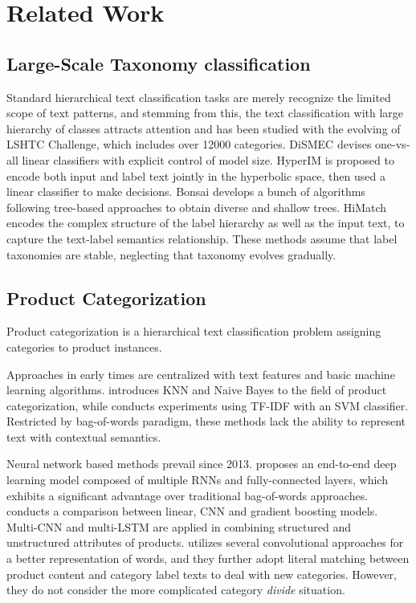 \section{Related Work}
\subsection{Large-Scale Taxonomy classification}
Standard hierarchical text classification tasks \cite{kowsari2017hdltex, sinha-etal-2018-hierarchical} are merely recognize the limited scope of text patterns, and stemming from this, the text classification with large hierarchy of classes attracts attention and has been studied with the evolving of LSHTC \cite{partalas2015lshtc} Challenge, which includes 
over 12000 categories. DiSMEC \cite{babbar2017dismec} devises one-vs-all linear classifiers 
with explicit control of model size. HyperIM \cite{chen2020hyperbolic} is proposed to encode both input and label text jointly in the hyperbolic space, then used a linear classifier to make decisions. Bonsai \cite{khandagale2020bonsai} develops a bunch of algorithms following tree-based approaches to obtain diverse and shallow trees. HiMatch~\cite{chen2021hierarchy} encodes the complex structure of the label hierarchy as well as the input text, to capture the text-label semantics relationship. These methods assume that label taxonomies are stable, neglecting that 
taxonomy evolves gradually. 
\subsection{Product Categorization}
Product categorization is a hierarchical text classification problem assigning categories to product instances. 

Approaches in early times are centralized with text features and basic machine learning algorithms. \cite{ding2002goldenbullet} introduces KNN and Naive Bayes to the field of product categorization, while \cite{yu2012product} 
conducts experiments using TF-IDF with an SVM classifier. Restricted by bag-of-words paradigm, these methods lack the ability to represent text with contextual semantics.

Neural network based methods prevail since 2013. \cite{ha2016large} proposes an end-to-end deep learning model composed of multiple RNNs and fully-connected layers, which exhibits a significant advantage over traditional bag-of-words approaches. 
\cite{das2016large} conducts a comparison between linear, CNN and gradient boosting models. 
Multi-CNN and multi-LSTM are applied in \cite{krishnan2019large} combining structured and unstructured attributes of products. 
\cite{chen2019fine} utilizes 
several convolutional approaches
for a better representation of words, and they further adopt literal matching between product content and category label texts to deal with new categories. However, they do not consider the more complicated category \textit{divide} situation. 


